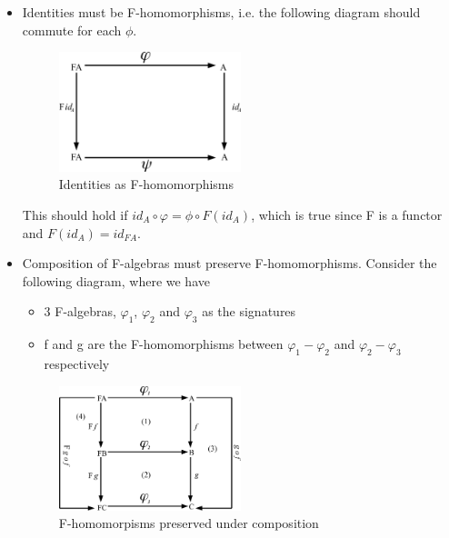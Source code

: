 \documentclass{article}
\begin{document}
\begin{itemize}
\item{Identities must be F-homomorphisms, i.e. the following diagram should commute for each $\phi$.

\begin{figure}[htb]
\begin{center}
\includegraphics[width=0.5\textwidth]{figures/alg2}
\caption{Identities as F-homomorphisms}
\end{center}
\end{figure}

This should hold if $id_{A} \circ \varphi = \phi \circ F(id_{A})$, which is true since F is a functor and $F(id_{A}) = id_{FA}$.
}
\item{Composition of F-algebras must preserve F-homomorphisms. Consider the following diagram, where we have 

\begin{itemize}
\item{3 F-algebras, $\varphi_{1}$, $\varphi_{2}$ and $\varphi_{3}$ as the signatures}
\item{f and g are the F-homomorphisms between $\varphi_{1}-\varphi_{2}$ and $\varphi_{2}-\varphi_{3}$ respectively}
\end{itemize}

\begin{figure}[htb]
\begin{center}
\includegraphics[width=0.5\textwidth]{figures/alg3}
\caption{F-homomorpisms preserved under composition}
\end{center}
\end{figure}


}
\end{itemize}
\end{document}
